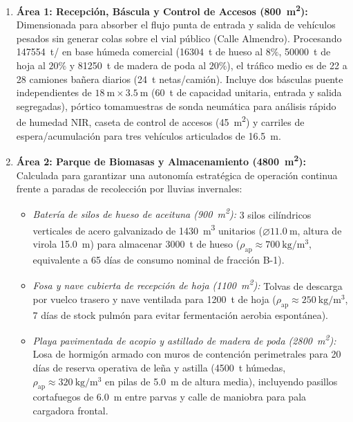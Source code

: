 \documentclass{report}
\begin{document}
\begin{enumerate}
    \item \textbf{Área 1: Recepción, Báscula y Control de Accesos (\SI{800}{\square\metre}):} Dimensionada para absorber el flujo punta de entrada y salida de vehículos pesados sin generar colas sobre el vial público (Calle Almendro). Procesando \SI{147554}{\tonne/} en base húmeda comercial (\SI{16304}{\tonne} de hueso al $8\%$, \SI{50000}{\tonne} de hoja al $20\%$ y \SI{81250}{\tonne} de madera de poda al $20\%$), el tráfico medio es de \num{22} a \num{28} camiones bañera diarios (\SI{24}{\tonne} netas/camión). Incluye dos básculas puente independientes de $\SI{18}{\metre} \times \SI{3.5}{\metre}$ (\SI{60}{\tonne} de capacidad unitaria, entrada y salida segregadas), pórtico tomamuestras de sonda neumática para análisis rápido de humedad NIR, caseta de control de accesos (\SI{45}{\square\metre}) y carriles de espera/acumulación para tres vehículos articulados de \SI{16.5}{\metre}.
    \item \textbf{Área 2: Parque de Biomasas y Almacenamiento (\SI{4800}{\square\metre}):} Calculada para garantizar una autonomía estratégica de operación continua frente a paradas de recolección por lluvias invernales:
          \begin{itemize}
              \item \textit{Batería de silos de hueso de aceituna (\SI{900}{\square\metre}):} \num{3} silos cilíndricos verticales de acero galvanizado de \SI{1430}{\cubic\metre} unitarios ($\varnothing \SI{11.0}{\metre}$, altura de virola \SI{15.0}{\metre}) para almacenar \SI{3000}{\tonne} de hueso ($\rho_{\text{ap}} \approx \SI{700}{\kilo\gram/\cubic\metre}$, equivalente a \num{65} días de consumo nominal de fracción B-1).
              \item \textit{Fosa y nave cubierta de recepción de hoja (\SI{1100}{\square\metre}):} Tolvas de descarga por vuelco trasero y nave ventilada para \SI{1200}{\tonne} de hoja ($\rho_{\text{ap}} \approx \SI{250}{\kilo\gram/\cubic\metre}$, \num{7} días de stock pulmón para evitar fermentación aerobia espontánea).
              \item \textit{Playa pavimentada de acopio y astillado de madera de poda (\SI{2800}{\square\metre}):} Losa de hormigón armado con muros de contención perimetrales para \num{20} días de reserva operativa de leña y astilla (\SI{4500}{\tonne} húmedas, $\rho_{\text{ap}} \approx \SI{320}{\kilo\gram/\cubic\metre}$ en pilas de \SI{5.0}{\metre} de altura media), incluyendo pasillos cortafuegos de \SI{6.0}{\metre} entre parvas y calle de maniobra para pala cargadora frontal.

\end{itemize}
\end{enumerate}
\end{document}
